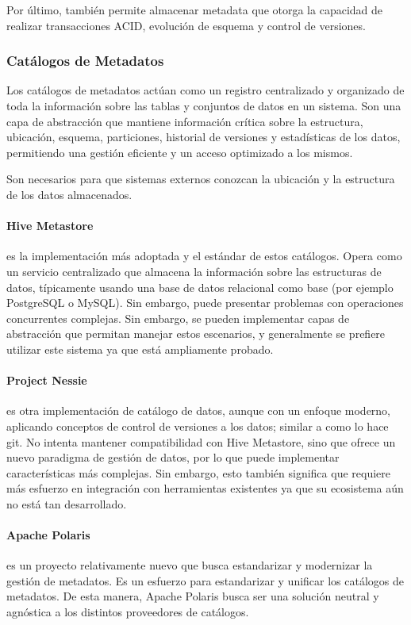 Por último, también permite almacenar metadata que otorga la capacidad de realizar transacciones ACID, evolución de esquema y control de versiones.

\newpage

\subsubsection{Catálogos de Metadatos}
Los catálogos de metadatos actúan como un registro centralizado y organizado de toda la información sobre las tablas y conjuntos de datos en un sistema. 
Son una capa de abstracción que mantiene información crítica sobre la estructura, ubicación, esquema, particiones, historial de versiones y estadísticas de los datos, 
permitiendo una gestión eficiente y un acceso optimizado a los mismos.

Son necesarios para que sistemas externos conozcan la ubicación y la estructura de los datos almacenados. 

\paragraph{Hive Metastore} es la implementación más adoptada y el estándar de estos catálogos. Opera como un servicio centralizado que almacena la información sobre las estructuras de datos,
típicamente usando una base de datos relacional como base (por ejemplo PostgreSQL o MySQL). Sin embargo, puede presentar problemas con operaciones concurrentes complejas. 
Sin embargo, se pueden implementar capas de abstracción que permitan manejar estos escenarios, y generalmente se prefiere utilizar este sistema ya que está ampliamente probado.

\paragraph{Project Nessie} es otra implementación de catálogo de datos, aunque con un enfoque moderno, aplicando conceptos de control de versiones a los datos; similar a como lo hace git. 
No intenta mantener compatibilidad con Hive Metastore, sino que ofrece un nuevo paradigma de gestión de datos, por lo que puede implementar características más complejas. 
Sin embargo, esto también significa que requiere más esfuerzo en integración con herramientas existentes ya que su ecosistema aún no está tan desarrollado.

\paragraph{Apache Polaris} es un proyecto relativamente nuevo que busca estandarizar y modernizar la gestión de metadatos. Es un esfuerzo para estandarizar y unificar los catálogos de metadatos.
De esta manera, Apache Polaris busca ser una solución neutral y agnóstica a los distintos proveedores de catálogos.  

